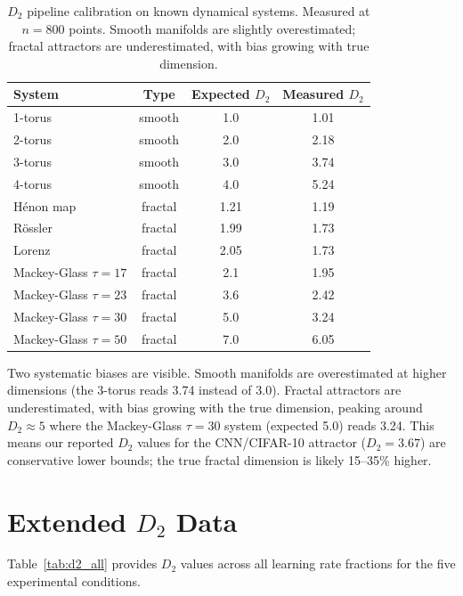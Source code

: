 \documentclass[aps,prl,twocolumn,superscriptaddress]{revtex4-2}
\begin{document}
\begin{table}[h]
\caption{\label{tab:calibration}%
$D_2$ pipeline calibration on known dynamical systems. Measured at $n=800$ points. Smooth manifolds are slightly overestimated; fractal attractors are underestimated, with bias growing with true dimension.}
\begin{ruledtabular}
\begin{tabular}{lccc}
System & Type & Expected $D_2$ & Measured $D_2$\\
\hline
1-torus & smooth & 1.0 & 1.01\\
2-torus & smooth & 2.0 & 2.18\\
3-torus & smooth & 3.0 & 3.74\\
4-torus & smooth & 4.0 & 5.24\\
H\'{e}non map & fractal & 1.21 & 1.19\\
R\"{o}ssler & fractal & 1.99 & 1.73\\
Lorenz & fractal & 2.05 & 1.73\\
Mackey-Glass $\tau{=}17$ & fractal & 2.1 & 1.95\\
Mackey-Glass $\tau{=}23$ & fractal & 3.6 & 2.42\\
Mackey-Glass $\tau{=}30$ & fractal & 5.0 & 3.24\\
Mackey-Glass $\tau{=}50$ & fractal & 7.0 & 6.05\\
\end{tabular}
\end{ruledtabular}
\end{table}

Two systematic biases are visible. Smooth manifolds are overestimated at higher dimensions (the 3-torus reads 3.74 instead of 3.0). Fractal attractors are underestimated, with bias growing with the true dimension, peaking around $D_2 \approx 5$ where the Mackey-Glass $\tau{=}30$ system (expected 5.0) reads 3.24. This means our reported $D_2$ values for the CNN/CIFAR-10 attractor ($D_2 = 3.67$) are conservative lower bounds; the true fractal dimension is likely 15--35\% higher.

\section{Extended $D_2$ Data}

Table~\ref{tab:d2_all} provides $D_2$ values across all learning rate fractions for the five experimental conditions.
\end{document}
